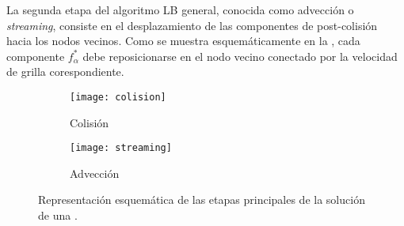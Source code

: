 La segunda etapa del algoritmo LB general, conocida como advecci\'on o \emph{streaming}, consiste en el desplazamiento de las componentes de post-colisi\'on hacia los nodos vecinos. Como se muestra esquem\'aticamente en la , cada componente $f_{\alpha}^*$ debe reposicionarse en el nodo vecino conectado por la velocidad de grilla corespondiente.

\begin{figure}[htb]
    \centering
    \begin{subfigure}[t]{0.45\textwidth}
        \centering
        \texttt{[image: colision]}
        \caption{Colisi\'on}        
    \end{subfigure}
    \begin{subfigure}[t]{0.45\textwidth}
        \centering
        \texttt{[image: streaming]}
        \caption{Advecci\'on}        
    \end{subfigure}
    \caption{Representaci\'on esquem\'atica de las etapas principales de la soluci\'on de una \lbe{}.}
    \label{fig:lb_str_col}
\end{figure}

